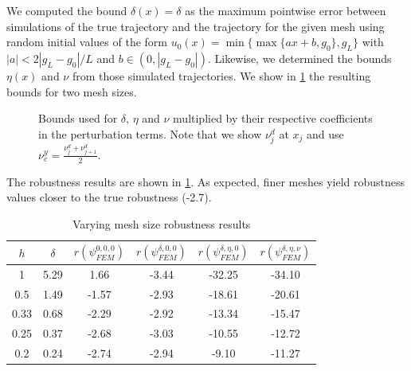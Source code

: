 \documentclass[letterpaper, 10 pt, conference]{ieeeconf/ieeeconf}
\begin{document}
We computed the bound $\delta(x) = \delta$ as the maximum pointwise
error between simulations of the true trajectory and the trajectory for the
given mesh using random initial values of the form $u_0(x) = \min\{\max\{a x +
b, g_0\}, g_L\}$ with $|a| < 2 |g_L - g_0| / L$ and $b \in (0, |g_L - g_0|)$.
Likewise, we determined the bounds $\eta(x)$ and $\nu$ from those simulated
trajectories. We show in \cref{fig:bounds} the resulting bounds for two mesh
sizes.

\begin{figure}[!t]
    \centering 
        \hfill
        \hfill
    \caption{Bounds used for $\delta$, $\eta$ and $\nu$ multiplied by their
    respective coefficients in the perturbation terms. Note that we show $\nu^d_j$ at
    $x_j$ and use $\nu_e^y = \frac{\nu^d_j + \nu^d_{j+1}}{2}$.}
    \label{fig:bounds}
\end{figure}

The robustness results are shown in \cref{tab:res_meshes}. As expected, finer meshes
yield robustness values closer to the true robustness (-2.7).

\begin{table}
\centering
\caption{Varying mesh size robustness results}
\label{tab:res_meshes}
\begin{tabular}{|c|c|c|c|c|c|}
    \hline
    $h$ & $\delta$ & $r(\psi_{FEM}^{0, 0, 0})$ & $r(\psi_{FEM}^{\delta, 0, 0})$ &
    $r(\psi_{FEM}^{\delta, \eta, 0})$ & $r(\psi_{FEM}^{\delta, \eta,
\nu})$ \\
    \hline
    1 & 5.29 & 1.66 & -3.44 & -32.25 & -34.10 \\
    0.5 & 1.49 & -1.57 & -2.93 & -18.61 & -20.61 \\
    0.33 & 0.68 & -2.29 & -2.92 & -13.34 & -15.47 \\
    0.25 & 0.37 & -2.68 & -3.03 & -10.55 & -12.72 \\
    0.2 & 0.24 & -2.74 & -2.94 & -9.10 & -11.27 \\
    \hline
\end{tabular}
\end{table}
\end{document}
